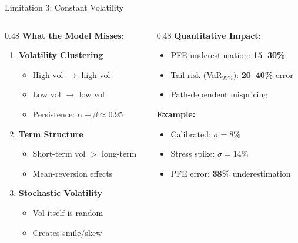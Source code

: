 \documentclass[11pt,aspectratio=169]{beamer}
\begin{document}
	
	\begin{frame}{Limitation 3: Constant Volatility}
		\begin{columns}[T]
			\begin{column}{0.48\textwidth}
				\textbf{What the Model Misses:}
				\begin{enumerate}
					\item \textbf{Volatility Clustering}
					\begin{itemize}
						\item High vol $\rightarrow$ high vol
						\item Low vol $\rightarrow$ low vol
						\item Persistence: $\alpha+\beta \approx 0.95$
					\end{itemize}
					
					\item \textbf{Term Structure}
					\begin{itemize}
						\item Short-term vol $>$ long-term
						\item Mean-reversion effects
					\end{itemize}
					
					\item \textbf{Stochastic Volatility}
					\begin{itemize}
						\item Vol itself is random
						\item Creates smile/skew
					\end{itemize}
				\end{enumerate}
			\end{column}
			
			\begin{column}{0.48\textwidth}
				\textbf{Quantitative Impact:}
				\begin{itemize}
					\item PFE underestimation: \textcolor{mufgred}{\textbf{15--30\%}}
					\item Tail risk (VaR$_{99\%}$): \textbf{20--40\%} error
					\item Path-dependent mispricing 
				\end{itemize}
				
				\vspace{0.3cm}
				
				\textbf{Example:}
				\begin{itemize}
					\item Calibrated: $\sigma = 8\%$
					\item Stress spike: $\sigma = 14\%$
					\item PFE error: \textbf{38\%} underestimation
				\end{itemize}
			\end{column}
		\end{columns}
	\end{frame}
	
\end{document}
